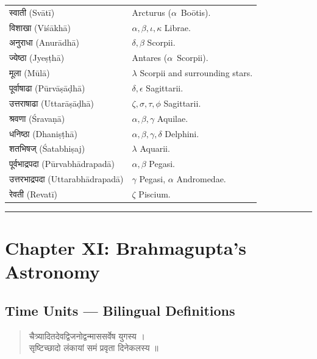 \documentclass[11pt,a4paper]{article}
\newcommand{\longline}{\noindent\rule{\textwidth}{0.4pt}}
\newcommand{\dev}[1]{{\devanagarifont #1}}
\theoremstyle{definition}
\begin{document}
\begin{longtable}{p{}p{}}
\dev{स्वाती} (Sv\=at\={i}) & Arcturus ($\alpha$~Bo\=otis). \\
\dev{विशाखा} (Vi\'{s}\=akh\={a}) & $\alpha, \beta, \iota, \kappa$ Librae. \\
\dev{अनुराधा} (Anur\=adh\={a}) & $\delta, \beta$ Scorpii. \\
\dev{ज्येष्ठा} (Jye\d{s}\d{t}h\={a}) & Antares ($\alpha$~Scorpii). \\
\dev{मूला} (M\=ul\={a}) & $\lambda$ Scorpii and surrounding stars. \\
\dev{पूर्वाषाढा} (P\={u}rv\=a\d{s}\=a\d{d}h\={a}) & $\delta, \epsilon$ Sagittarii. \\
\dev{उत्तराषाढा} (Uttar\=a\d{s}\=a\d{d}h\={a}) & $\zeta, \sigma, \tau, \phi$ Sagittarii. \\
\dev{श्रवणा} (\'{S}rava\d{n}\={a}) & $\alpha, \beta, \gamma$ Aquilae. \\
\dev{धनिष्ठा} (Dhani\d{s}\d{t}h\={a}) & $\alpha, \beta, \gamma, \delta$ Delphini. \\
\dev{शतभिषज्} ({\'{S}}atabhi\d{s}aj) & $\lambda$ Aquarii. \\
\dev{पूर्वभाद्रपदा} (P\={u}rvabh\=adrapad\={a}) & $\alpha, \beta$ Pegasi. \\
\dev{उत्तरभाद्रपदा} (Uttarabh\=adrapad\={a}) & $\gamma$ Pegasi, $\alpha$ Andromedae. \\
\dev{रेवती} (Revat\={i}) & $\zeta$ Piscium. \\
\bottomrule
\end{longtable}

\longline

\section{Chapter XI: Brahmagupta's Astronomy}
\label{sec:astronomy}

\subsection*{Time Units --- Bilingual Definitions}



\noindent
\begin{quote}
\dev{चैत्र्यादितदेवद्विजनोद्वन्माससर्वेष युगस्य ।\\
सृष्टिच्छादो लंकायां समं प्रवृता दिनेकलस्य ॥}
\end{quote}
\end{document}
